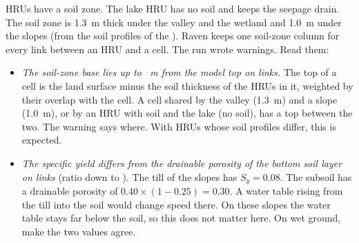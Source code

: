 \why {} HRUs have a soil zone. The lake HRU has no soil and keeps the seepage drain. The soil zone is 1.3~m
thick under the valley and the wetland and 1.0~m under the slopes (from the soil profiles of the ). Raven keeps
one soil-zone column for every link between an HRU and a cell. The run wrote  warnings. Read them:
\begin{itemize}
\item \emph{The soil-zone base lies up to ~m from the model top on  links.} The top of a cell
  is the land surface minus the soil thickness of the HRUs in it, weighted by their overlap with the cell. A cell shared by
  the valley (1.3~m) and a slope (1.0~m), or by an HRU with soil and the lake (no soil), has a top between the two. The
  warning says where. With HRUs whose soil profiles differ, this is expected.
\item \emph{The specific yield differs from the drainable porosity of the bottom soil layer on  links}
  (ratio down to ). The till of the slopes has $S_y=0.08$. The subsoil has a drainable porosity of
  $0.40\times(1-0.25)=0.30$. A water table rising from the till into the soil would change speed there. On these slopes
  the water table stays far below the soil, so this does not matter here. On wet ground, make the two values agree.
\end{itemize}

